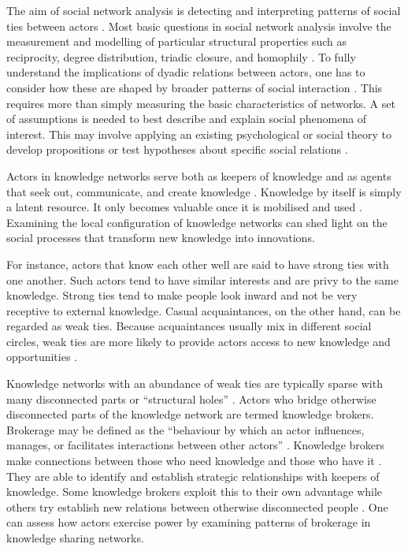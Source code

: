The aim of social network analysis is detecting and interpreting patterns of social ties between actors \citep{wasserman1994social,de2011exploratory}. Most basic questions in social network analysis involve the measurement and modelling of particular structural properties such as reciprocity, degree distribution, triadic closure, and homophily \citep{butts2008social,snijders2011statistical}. To fully understand the implications of dyadic relations between actors, one has to consider how these are shaped by broader patterns of social interaction \citep{scott2011sage}. This requires more than simply measuring the basic characteristics of networks. A set of assumptions is needed to best describe and explain social phenomena of interest. This may involve applying an existing psychological or social theory to develop propositions or test hypotheses about specific social relations \citep{scott2011sage,borgatti2013analyzing}. \medskip

Actors in knowledge networks serve both as keepers of knowledge and as agents that seek out, communicate, and create knowledge \citep{phelps2012knowledge,pugh2013designing}. Knowledge by itself is simply a latent resource. It only becomes valuable once it is mobilised and used \citep{marabelli2012knowledge,freeman2015knowledge}. Examining the local configuration of knowledge networks can shed light on the social processes that transform new knowledge into innovations. \medskip

For instance, actors that know each other well are said to have strong ties with one another. Such actors tend to have similar interests and are privy to the same knowledge. Strong ties tend to make people look inward and not be very receptive to external knowledge. Casual acquaintances, on the other hand, can be regarded as weak ties. Because acquaintances usually mix in different social circles, weak ties are more likely to provide actors access to new knowledge and opportunities \citep{granovetter1973strength}. \medskip

Knowledge networks with an abundance of weak ties are typically sparse with many disconnected parts or \enquote{structural holes} \citep{burt1992structural}. Actors who bridge otherwise disconnected parts of the knowledge network are termed knowledge brokers. Brokerage may be defined as the \enquote{behaviour by which an actor influences, manages, or facilitates interactions between other actors} \citep{obstfeld2014brokerage}. Knowledge brokers make connections between those who need knowledge and those who have it \citep{davenport1998successful}. They are able to identify and establish strategic relationships with keepers of knowledge. Some knowledge brokers exploit this to their own advantage while others try establish new relations between otherwise disconnected people \citep{gould1989structures,burt1992structural,obstfeld2014brokerage}. One can assess how actors exercise power by examining patterns of brokerage in knowledge sharing networks. \medskip

